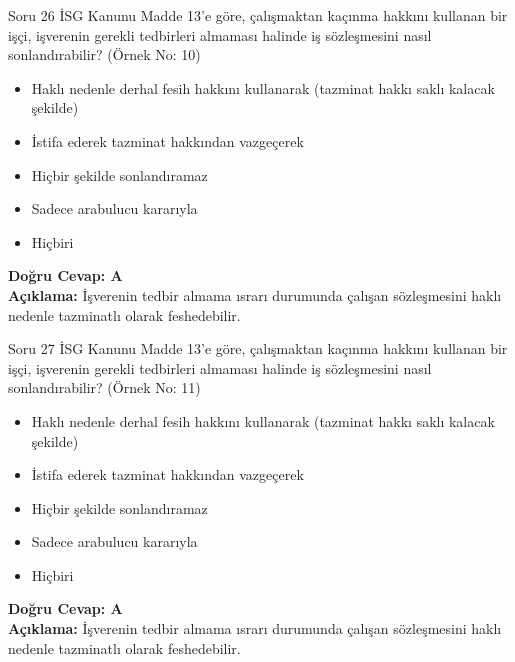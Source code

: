 \documentclass[12pt,a4paper]{article}
\begin{document}
\begin{testcard}{Soru 26}
    İSG Kanunu Madde 13'e göre, çalışmaktan kaçınma hakkını kullanan bir işçi, işverenin gerekli tedbirleri almaması halinde iş sözleşmesini nasıl sonlandırabilir? (Örnek No: 10)
    \begin{itemize}
        \item[A)] Haklı nedenle derhal fesih hakkını kullanarak (tazminat hakkı saklı kalacak şekilde)
        \item[B)] İstifa ederek tazminat hakkından vazgeçerek
        \item[C)] Hiçbir şekilde sonlandıramaz
        \item[D)] Sadece arabulucu kararıyla
        \item[E)] Hiçbiri
    \end{itemize}
    \tcblower
    \textbf{Doğru Cevap: A} \\
    \textbf{Açıklama:} İşverenin tedbir almama ısrarı durumunda çalışan sözleşmesini haklı nedenle tazminatlı olarak feshedebilir.
\end{testcard}

\begin{testcard}{Soru 27}
    İSG Kanunu Madde 13'e göre, çalışmaktan kaçınma hakkını kullanan bir işçi, işverenin gerekli tedbirleri almaması halinde iş sözleşmesini nasıl sonlandırabilir? (Örnek No: 11)
    \begin{itemize}
        \item[A)] Haklı nedenle derhal fesih hakkını kullanarak (tazminat hakkı saklı kalacak şekilde)
        \item[B)] İstifa ederek tazminat hakkından vazgeçerek
        \item[C)] Hiçbir şekilde sonlandıramaz
        \item[D)] Sadece arabulucu kararıyla
        \item[E)] Hiçbiri
    \end{itemize}
    \tcblower
    \textbf{Doğru Cevap: A} \\
    \textbf{Açıklama:} İşverenin tedbir almama ısrarı durumunda çalışan sözleşmesini haklı nedenle tazminatlı olarak feshedebilir.
\end{testcard}
\end{document}
